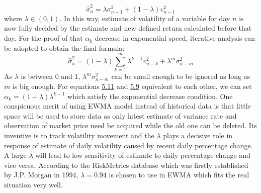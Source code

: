 \begin{equation}\label{5.11}
\hat{\sigma}_n^2=\lambda\sigma_{n-1}^2+(1-\lambda)v_{n-1}^2
\end{equation}
where $\lambda\in(0,1)$. In this way, estimate of volatility of a variable for day $n$ is now fully decided by the estimate and new defined return calculated before that day. For the proof of that $\alpha_k$ decrease in exponential speed, iterative analysis can be adopted to obtain the final formula: 
\begin{equation}\label{5.12}
\hat{\sigma}_n^2=(1-\lambda)\sum_{k=1}^m\lambda^{k-1}v_{n-k}^2+\lambda^m\sigma_{n-m}^2
\end{equation} 
As $\lambda$ is between 0 and 1, $\lambda^m\sigma_{n-m}^2$ can be small enough to be ignored as long as $m$ is big enough. For  equations \hyperref[5.11]{5.11} and \hyperref[5.9]{5.9} equivalent to each other, we can set  $\alpha_k=(1-\lambda)\lambda^{k-1}$ which satisfy the exponential decrease condition. One conspicuous merit of using EWMA model instead of historical data is that little space will be used to store data as only latest estimate of variance rate and observation of market price need be acquired while the old one can be deleted. Its inventive is to track volatility movement and the $\lambda$ plays a decisive role in response of estimate of daily volatility caused by recent daily percentage change. A large $\lambda$ will lead to low sensitivity of estimate to daily percentage change and vice versa. According to the RiskMetrics database which was firstly established by  J.P. Morgan in 1994, $\lambda=0.94$ is chosen to use in EWMA which fits the real situation very well. 
